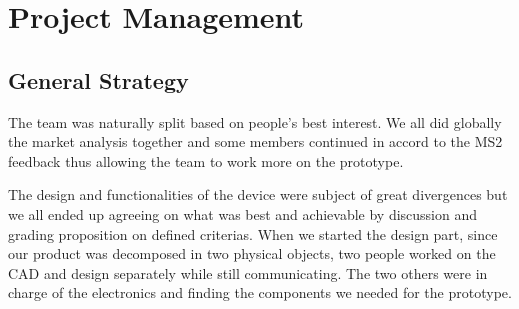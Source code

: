 \documentclass{article}
\begin{document}



\section{Project Management}

\subsection{General Strategy}
The team was naturally split based on people's best interest. We all did globally the market analysis together and some members continued in accord to the MS2 feedback thus allowing the team to work more on the prototype. \vspace{0.2cm}

The design and functionalities of the device were subject of great divergences but we all ended up agreeing on what was best and achievable by discussion and grading proposition on defined criterias. When we started the design part, since our product was decomposed in two physical objects, two people worked on the CAD and design separately while still communicating. The two others were in charge of the electronics and finding the components we needed for the prototype.\vspace{0.2cm}
\end{document}
